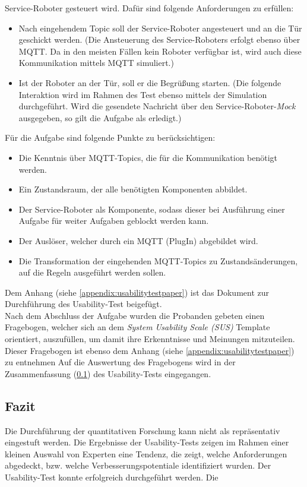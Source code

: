         Service-Roboter gesteuert wird. Dafür sind folgende Anforderungen zu erfüllen: 
        \begin{itemize}
            \item Nach eingehendem Topic soll der Service-Roboter angesteuert und an die Tür geschickt werden. 
            (Die Ansteuerung des Service-Roboters erfolgt ebenso über \acs{MQTT}. Da in den meisten Fällen kein Roboter verfügbar ist, wird auch 
            diese Kommunikation mittels \acs{MQTT} simuliert.)
            \item Ist der Roboter an der Tür, soll er die Begrüßung starten. (Die folgende Interaktion wird im Rahmen des Test ebenso mittels der Simulation durchgeführt. 
            Wird die gesendete Nachricht über den Service-Roboter-\textit{Mock} ausgegeben, so gilt die Aufgabe als erledigt.)
        \end{itemize}
        Für die Aufgabe sind folgende Punkte zu berücksichtigen:
        \begin{itemize}
            \item Die Kenntnis über \acs{MQTT}-Topics, die für die Kommunikation benötigt werden.
            \item Ein Zustandsraum, der alle benötigten Komponenten abbildet.
            \item Der Service-Roboter als Komponente, sodass dieser bei Ausführung einer Aufgabe für weiter Aufgaben geblockt werden kann. 
            \item Der Auslöser, welcher durch ein \acs{MQTT} (PlugIn) abgebildet wird.
            \item Die Transformation der eingehenden \acs{MQTT}-Topics zu Zustandsänderungen, auf die Regeln ausgeführt werden sollen.
        \end{itemize}
        Dem Anhang (siehe \ref{appendix:usabilitytestpaper}) ist das Dokument zur Durchführung des Usability-Test beigefügt. 
        \\
        \linebreak
        Nach dem Abschluss der Aufgabe wurden die Probanden gebeten einen Fragebogen, welcher sich an dem \textit{System Usability Scale (SUS)} 
        Template orientiert, auszufüllen, um damit ihre Erkenntnisse und Meinungen mitzuteilen. Dieser Fragebogen ist ebenso dem Anhang (siehe \ref{appendix:usabilitytestpaper}) zu entnehmen Auf die Auswertung des Fragebogens wird in der 
        Zusammenfassung (\ref{subsec:usabilityFazit}) des Usability-Tests eingegangen. 

    \subsection{Fazit}
    \label{subsec:usabilityFazit}
        Die Durchführung der quantitativen Forschung kann nicht als repräsentativ eingestuft werden. Die Ergebnisse der 
        Usability-Tests zeigen im Rahmen einer kleinen Auswahl von Experten eine Tendenz, die zeigt, welche Anforderungen abgedeckt, bzw. 
        welche Verbesserungspotentiale identifiziert wurden. Der Usability-Test konnte erfolgreich durchgeführt werden. 
        Die 
        
